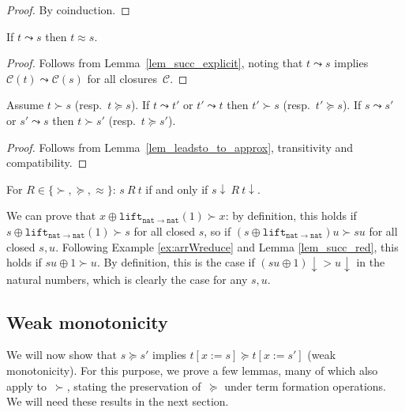 \documentclass[a4paper,UKenglish,cleveref,autoref,numberwithinsect]{lipics-v2019}
\theoremstyle{definition}
\newcommand{\arrtype}{\rightarrow}
\newcommand{\subst}[2]{#1:=#2}
\newcommand{\arrW}{\leadsto}
\newcommand{\nat}{\mathtt{nat}}
\newcommand{\lift}{\mathtt{lift}}
\newcommand{\cl}{\mathcal{C}}
\begin{document}
\begin{proof}
  By coinduction.
\end{proof}

\begin{lemma}\label{lem_leadsto_to_approx}
  If $t \arrW s$ then $t \approx s$.
\end{lemma}

\begin{proof}
  Follows from Lemma~\ref{lem_succ_explicit}, noting that $t \arrW s$
  implies $\cl(t) \arrW \cl(s)$ for all closures~$\cl$.
\end{proof}

\begin{lemma}\label{lem_succ_red}
  Assume $t \succ s$ (resp.~$t \succeq s$). If $t \leadsto t'$ or
  $t' \leadsto t$ then $t' \succ s$ (resp.~$t' \succeq s$). If
  $s \leadsto s'$ or $s' \leadsto s$ then $t \succ s'$
  (resp.~$t \succeq s'$).
\end{lemma}

\begin{proof}
  Follows from Lemma~\ref{lem_leadsto_to_approx}, transitivity and
  compatibility.
\end{proof}

\begin{corollary}\label{cor_succ_da}
  For $R \in \{\succ,\succeq,\approx\}$: $s\ R\ t$ if and only if
  $s\downarrow\ R\ t\downarrow$.
\end{corollary}

\begin{example}\label{ex:plus1}
We can prove that $x \oplus \lift_{\nat \arrtype \nat}(1)
\succ x$: by
definition, this holds if $s \oplus \lift_{\nat \arrtype \nat}(1) \succ
s$ for all closed $s$, so if $(s \oplus \lift_{\nat \arrtype \nat})u
\succ s u$ for all closed $s,u$.
Following Example \ref{ex:arrWreduce} and Lemma \ref{lem_succ_red},
this holds if $s u \oplus 1 \succ u$.  By definition, this is the
case if $(s u \oplus 1)\downarrow > u\downarrow$ in the natural numbers,
which is clearly the case for any $s,u$.
\end{example}

\subsection{Weak monotonicity}\label{subsec:weakmono}

We will now show that $s \succeq s'$ implies $t[\subst{x}{s}] \succeq
t[\subst{x}{s'}]$ (weak monotonicity).
For this purpose, we prove a few lemmas, many of
which also apply to~$\succ$, stating the preservation of~$\succeq$
under term formation operations. We will need these results in the next section.
\end{document}
